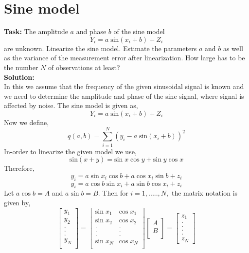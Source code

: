 \section{Sine model }
\noindent \textbf{Task:} The amplitude $a$ and phase $b$ of the sine model
$$ Y_i = a \; \text{sin}(x_i + b) + Z_i  $$
\noindent are unknown. Linearize the sine model. Estimate the parameters $a$ and $b$ as well as the variance of the measurement error after linearization. How large has to be the number $N$ of observations at least?\\
\noindent \textbf{Solution:}\\
\noindent In this we assume that the frequency of the given sinusoidal signal is known and we need to determine the amplitude and phase of the sine signal, where signal is affected by noise. The sine model is given as,
$$ Y_i = a \; \text{sin}(x_i + b) + Z_i  $$
\noindent Now we define, 
$$q(a,b) = \sum_{i=1}^{N}(y_i - a\;\text{sin}(x_i + b))^2$$
\noindent In-order to linearize the given model we use, 
$$\text{sin}(x+y) = \text{sin}\;x\; \text{cos}\;y + \text{sin}\;y\; \text{cos}\; x$$
\noindent Therefore,
$$y_i = a\;\text{sin}\;x_i\;\text{cos}\;b + a\;\text{cos}\;x_i\;\text{sin}\;b + z_i$$
$$y_i = a\;\text{cos}\;b\;\text{sin}\;x_i + a\;\text{sin}\;b\;\text{cos}\;x_i +z_i$$
Let $a\;\text{cos}\;b = A$ and $a\;\text{sin}\;b = B$. Then for $ i=1,.....,N,$ the matrix notation is given by,
\[
\begin{bmatrix}
{y_1}\\
{y_2}\\
.\\
.\\
.\\
{y_N}\\
\end{bmatrix}
=
\begin{bmatrix}
\text{sin}\;x_1& \text{cos}\;x_1\\
\text{sin}\;x_2& \text{cos}\;x_2\\
. & .\\
. & .\\
. & .\\
\text{sin}\;x_N& \text{cos}\;x_N\\
\end{bmatrix}
\begin{bmatrix}
A\\
B\\
\end{bmatrix}
=\begin{bmatrix}
{z_1}\\
.\\
.\\
.\\
.\\
{z_N}
\end{bmatrix}
\]
